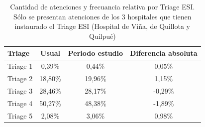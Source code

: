 \documentclass{article}
\begin{document}
\begin{table}[H]
\centering
\begin{tabular}{@{}lccc@{}}
\toprule
\textbf{Triage} & \textbf{Usual} & \textbf{Periodo estudio} & \textbf{Diferencia absoluta} \\ \midrule
Triage 1        & 0,39\%         & 0,44\%                   & 0,05\%                       \\
Triage 2        & 18,80\%        & 19,96\%                  & 1,15\%                       \\
Triage 3        & 28,46\%        & 28,17\%                  & -0,29\%                      \\
Triage 4        & 50,27\%        & 48,38\%                  & -1,89\%                      \\
Triage 5        & 2,08\%         & 3,06\%                   & 0,98\%                       \\ \bottomrule
\end{tabular}
\caption{Cantidad de atenciones y frecuancia relativa por Triage ESI. Sólo se presentan atenciones de los 3 hospitales que tienen instaurado el Triage ESI (Hospital de Viña, de Quillota y Quilpué)}
\end{table}
\end{document}
